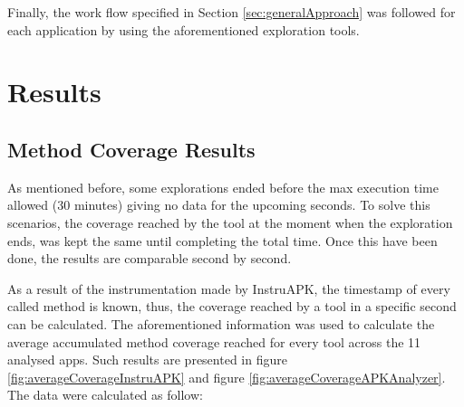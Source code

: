 \begin{table}[t]
	\centering
	\caption{Applications used for the study}
	\label{tab:apps}
\end{table}

Finally, the work flow specified in Section \ref{sec:generalApproach} was followed for each application by using the aforementioned exploration tools. 

\section{Results}\label{sec:results}

\subsection{Method Coverage Results}\label{sec:coverageResults}

As mentioned before, some explorations ended before the max execution time allowed (30 minutes) giving no data for the upcoming seconds. To solve this scenarios, the coverage reached by the tool at the moment when the exploration ends, was kept the same until completing the total time. Once this have been done, the results are comparable second by second.


As a result of the instrumentation made by InstruAPK, the timestamp of every called method is known, thus, the coverage reached by a tool in a specific second can be calculated. The aforementioned information was used to calculate the average accumulated method coverage reached for every tool across the 11 analysed apps. Such results are presented in figure \ref{fig:averageCoverageInstruAPK} and figure \ref{fig:averageCoverageAPKAnalyzer}. The data were calculated as follow:

